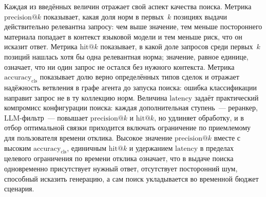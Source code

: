 Каждая из введённых величин отражает свой аспект качества поиска. Метрика $\mathrm{precision}@k$ показывает, какая доля норм в первых~$k$ позициях выдачи действительно релевантна запросу: чем выше значение, тем меньше постороннего материала попадает в контекст языковой модели и тем меньше риск, что он исказит ответ. Метрика $\mathrm{hit}@k$ показывает, в какой доле запросов среди первых~$k$ позиций нашлась хотя бы одна релевантная норма; значение, равное единице, означает, что ни один запрос не остался без нужного контекста. Метрика $\mathrm{accuracy}_{\mathrm{cls}}$ показывает долю верно определённых типов сделок и отражает надёжность ветвления в графе агента до запуска поиска: ошибка классификации направит запрос не в ту коллекцию норм. Величина $\mathrm{latency}$ задаёт практический компромисс конфигурации поиска: каждая дополнительная ступень~--- реранкер, LLM-фильтр~--- повышает $\mathrm{precision}@k$ и $\mathrm{hit}@k$, но удлиняет обработку, и в отбор оптимальной связки приходится включать ограничение по приемлемому для пользователя времени отклика. Высокое значение $\mathrm{precision}@k$ вместе с высоким $\mathrm{accuracy}_{\mathrm{cls}}$, единичным $\mathrm{hit}@k$ и удержанием $\mathrm{latency}$ в пределах целевого ограничения по времени отклика означает, что в выдаче поиска одновременно присутствует нужный ответ, отсутствует посторонний шум, способный исказить генерацию, а сам поиск укладывается во временной бюджет сценария.

